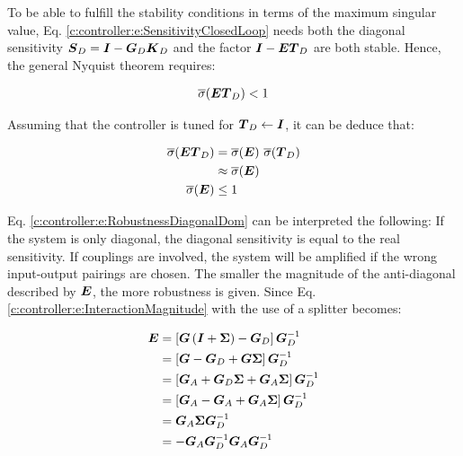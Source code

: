 To be able to fulfill the stability conditions in terms of the maximum singular value, Eq. \ref{c:controller:e:SensitivityClosedLoop} needs both the diagonal sensitivity $\mbox{\boldmath$S$}_D =  \mbox{\boldmath$I$} - \mbox{\boldmath$G$}_D \mbox{\boldmath$K$}_D$ and the factor $\mbox{\boldmath$I$} - \mbox{\boldmath$E$} \mbox{\boldmath$T$}_D$ are both stable. Hence, the general Nyquist theorem requires:

\begin{align}
\overline{\sigma}(\mbox{\boldmath$E$}\mbox{\boldmath$T$}_D) < 1
\end{align}

Assuming that the controller is tuned for $\mbox{\boldmath$T$}_D \leftarrow \mbox{\boldmath$I$}$, it can be deduce that:

\begin{align}
\begin{split}
\overline{\sigma}(\mbox{\boldmath$E$}\mbox{\boldmath$T$}_D) &= \overline{\sigma}(\mbox{\boldmath$E$})~\overline{\sigma}(\mbox{\boldmath$T$}_D) \\
&\approx \overline{\sigma}(\mbox{\boldmath$E$}) \\
\overline{\sigma}(\mbox{\boldmath$E$}) &\leq 1
\end{split}
\label{c:controller:e:RobustnessDiagonalDom}
\end{align}

Eq. \ref{c:controller:e:RobustnessDiagonalDom} can be interpreted the following: If the system is only diagonal, the diagonal sensitivity is equal to the real sensitivity. If couplings are involved, the system will be amplified if the wrong input-output pairings are chosen. The smaller the magnitude of the anti-diagonal described by $\mbox{\boldmath$E$}$, the more robustness is given. Since Eq.\ref{c:controller:e:InteractionMagnitude} with the use of a splitter becomes:

\begin{align}
\begin{split}
\mbox{\boldmath$E$} &= \left[ \mbox{\boldmath$G$} \left(\mbox{\boldmath$I$}+\mbox{\boldmath$\Sigma$}\right)- \mbox{\boldmath$G$}_D \right]\mbox{\boldmath$G$}_D^{-1} \\
&= \left[\mbox{\boldmath$G$}-\mbox{\boldmath$G$}_D + \mbox{\boldmath$G$}\mbox{\boldmath$\Sigma$}\right]\mbox{\boldmath$G$}_D^{-1} \\
&= \left[\mbox{\boldmath$G$}_A + \mbox{\boldmath$G$}_D \mbox{\boldmath$\Sigma$}+\mbox{\boldmath$G$}_A \mbox{\boldmath$\Sigma$}\right]\mbox{\boldmath$G$}_D^{-1} \\
&= \left[\mbox{\boldmath$G$}_A - \mbox{\boldmath$G$}_A +\mbox{\boldmath$G$}_A \mbox{\boldmath$\Sigma$}\right]\mbox{\boldmath$G$}_D^{-1} \\
&= \mbox{\boldmath$G$}_A \mbox{\boldmath$\Sigma$}\mbox{\boldmath$G$}_D^{-1} \\
&= -\mbox{\boldmath$G$}_A\mbox{\boldmath$G$}_D^{-1}\mbox{\boldmath$G$}_A\mbox{\boldmath$G$}_D^{-1} \\
\end{split}
\label{c:controller:SplitterMagnitude}
\end{align}

